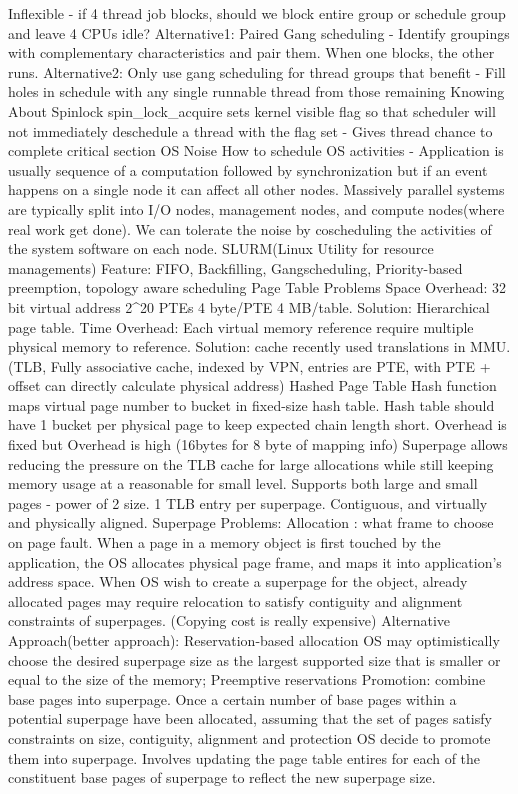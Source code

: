 \documentclass[10pt,landscape]{article}
\begin{document}
\begin{multicols}{3}
Inflexible - if 4 thread job blocks, should we block entire group or schedule group and leave 4 CPUs idle? Alternative1: Paired Gang scheduling - Identify groupings with complementary characteristics and pair them. When one blocks, the other runs. Alternative2: Only use gang scheduling for thread groups that benefit - Fill holes in schedule with any single runnable thread from those remaining Knowing About Spinlock spin_lock_acquire sets kernel visible flag so that scheduler will not immediately deschedule a thread with the flag set - Gives thread chance to complete critical section OS Noise How to schedule OS activities - Application is usually sequence of a computation followed by synchronization but if an event happens on a single node it can affect all other nodes. Massively parallel systems are typically split into I/O nodes, management nodes, and compute nodes(where real work get done). We can tolerate the noise by coscheduling the activities of the system software on each node. SLURM(Linux Utility for resource managements) Feature: FIFO, Backfilling, Gangscheduling, Priority-based preemption, topology aware scheduling Page Table Problems Space Overhead: 32 bit virtual address  2^20 PTEs 4 byte/PTE 4 MB/table. Solution: Hierarchical page table. Time Overhead:  Each virtual memory reference require multiple physical memory to reference. Solution: cache recently used translations in MMU. (TLB, Fully associative cache, indexed by VPN, entries are PTE, with PTE + offset can directly calculate physical address) Hashed Page Table Hash function maps virtual page number to bucket in fixed-size hash table. Hash table should have 1 bucket per physical page to keep expected chain length short. Overhead is fixed but Overhead is high (16bytes for 8 byte of mapping info) Superpage allows reducing the pressure on the TLB cache for large allocations while still keeping memory usage at a reasonable for small level. Supports both large and small pages - power of 2 size. 1 TLB entry per superpage. Contiguous, and virtually and physically aligned. Superpage Problems: Allocation : what frame to choose on page fault. When a page in a memory object is first touched by the application, the OS allocates physical page frame, and maps it into application’s address space. When OS wish to create a superpage for the object, already allocated pages may require relocation to satisfy contiguity and alignment constraints of superpages. (Copying cost is really expensive) Alternative Approach(better approach): Reservation-based allocation OS may optimistically choose the desired superpage size as the largest supported size that is smaller or equal to the size of the memory; Preemptive reservations Promotion: combine base pages into superpage. Once a certain number of base pages within a potential superpage have been allocated, assuming that the set of pages satisfy constraints on size, contiguity, alignment and protection OS decide to promote them into superpage. Involves updating the page table entires for each of the constituent base pages of superpage to reflect the new superpage size.


\end{multicols}
\end{document}
